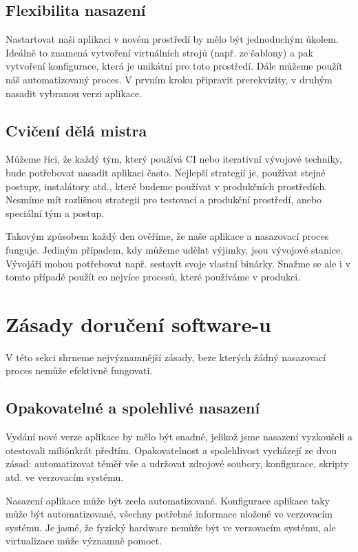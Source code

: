 \subsection{Flexibilita nasazení}
Nastartovat naši aplikaci v novém prostředí by mělo být jednoduchým úkolem. Ideálně to znamená vytvoření virtuálních strojů (např. ze šablony) a pak vytvoření konfigurace, která je unikátní pro toto prostředí. Dále můžeme použít náš automatizovaný proces. V prvním kroku připravit prerekvizity, v druhým nasadit vybranou verzi aplikace.

\subsection{Cvičení dělá mistra}
Můžeme říci, že každý tým, který používá CI nebo iterativní vývojové techniky, bude potřebovat nasadit aplikaci často. Nejlepší strategií je, používat stejné postupy, instalátory atd., které budeme používat v produkčních prostředích. Nesmíme mít rozlišnou strategii pro testovací a produkční prostředí, anebo speciální tým a postup. 

Takovým způsobem každý den ověříme, že naše aplikace a nasazovací proces funguje. Jediným případem, kdy můžeme udělat výjimky, jsou vývojové stanice. Vývojáři mohou potřebovat např. sestavit svoje vlastní binárky. Snažme se ale i v tomto případě použít co nejvíce procesů, které používáme v produkci.

\section{Zásady doručení software-u}
V této sekci shrneme nejvýznamnější zásady, beze kterých žádný nasazovací proces nemůže efektivně fungovati. 

\subsection{Opakovatelné a spolehlivé nasazení}
Vydání nové verze aplikace by mělo být snadné, jelikož jsme nasazení vyzkoušeli a otestovali miliónkrát předtím. Opakovatelnost a spolehlivost vycházejí ze dvou zásad: automatizovat téměř vše a udržovat zdrojové soubory, konfigurace, skripty atd. ve verzovacím systému.

Nasazení aplikace může být zcela automatizované. Konfigurace aplikace taky může být automatizované, všechny potřebné informace uložené ve verzovacím systému. Je jasné, že fyzický hardware nemůže být ve verzovacím systému, ale virtualizace může významně pomoct.

